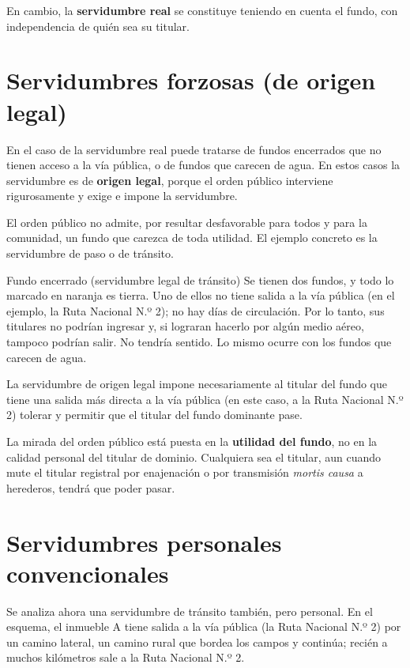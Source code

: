 \documentclass[12pt,oneside]{book}
\begin{document}
En cambio, la \textbf{servidumbre real} se constituye teniendo en cuenta el fundo, con independencia de quién sea su titular.

\section{Servidumbres forzosas (de origen legal)}

En el caso de la servidumbre real puede tratarse de fundos encerrados que no tienen acceso a la vía pública, o de fundos que carecen de agua. En estos casos la servidumbre es de \textbf{origen legal}, porque el orden público interviene rigurosamente y exige e impone la servidumbre.

El orden público no admite, por resultar desfavorable para todos y para la comunidad, un fundo que carezca de toda utilidad. El ejemplo concreto es la servidumbre de paso o de tránsito.

\begin{example}{Fundo encerrado (servidumbre legal de tránsito)}
Se tienen dos fundos, y todo lo marcado en naranja es tierra. Uno de ellos no tiene salida a la vía pública (en el ejemplo, la Ruta Nacional N.º 2); no hay días de circulación. Por lo tanto, sus titulares no podrían ingresar y, si lograran hacerlo por algún medio aéreo, tampoco podrían salir. No tendría sentido. Lo mismo ocurre con los fundos que carecen de agua.

La servidumbre de origen legal impone necesariamente al titular del fundo que tiene una salida más directa a la vía pública (en este caso, a la Ruta Nacional N.º 2) tolerar y permitir que el titular del fundo dominante pase.
\end{example}

\begin{important}
La mirada del orden público está puesta en la \textbf{utilidad del fundo}, no en la calidad personal del titular de dominio. Cualquiera sea el titular, aun cuando mute el titular registral por enajenación o por transmisión \textit{mortis causa} a herederos, tendrá que poder pasar.
\end{important}

\section{Servidumbres personales convencionales}

Se analiza ahora una servidumbre de tránsito también, pero personal. En el esquema, el inmueble A tiene salida a la vía pública (la Ruta Nacional N.º 2) por un camino lateral, un camino rural que bordea los campos y continúa; recién a muchos kilómetros sale a la Ruta Nacional N.º 2.
\end{document}
